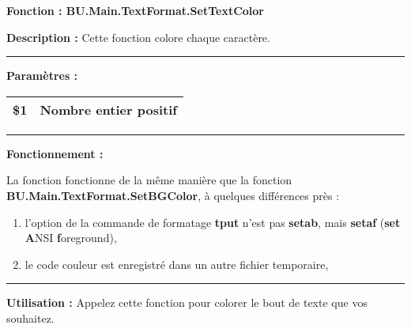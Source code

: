 \documentclass[a4paper,10pt]{article}
\begin{document}
    \begin{justify}
        \textbf{Fonction : \color{func}BU.Main.TextFormat.SetTextColor}
    \end{justify}

    \begin{justify}
        \textbf{Description :} Cette fonction colore chaque caractère.
    \end{justify}


    \par\noindent\rule{\textwidth}{0.4pt}

    \begin{justify}
        \textbf{Paramètres :}

        \begin{tabular}{|l|l|}
            \hline
            \textbf{\color{orange}\$1} & Nombre entier positif\\
            \hline
        \end{tabular}
    \end{justify}


    \par\noindent\rule{\textwidth}{0.4pt}

    \begin{justify}
        \textbf{Fonctionnement :}

        La fonction fonctionne de la même manière que la fonction \textbf{\color{func}BU.Main.TextFormat.SetBGColor}, à quelques différences près :
        \begin{enumerate}
            \item l'option de la commande de formatage \textbf{\color{cmds}tput} n'est pas \textbf{setab}, mais \textbf{setaf} (\textbf{set} \textbf{A}NSI \textbf{f}oreground),
            \item le code couleur est enregistré dans un autre fichier temporaire,
        \end{enumerate}
    \end{justify}




    \par\noindent\rule{\textwidth}{0.4pt}

    \begin{justify}
        \textbf{Utilisation :} Appelez cette fonction pour colorer le bout de texte que vos souhaitez.
    \end{justify}
\end{document}
